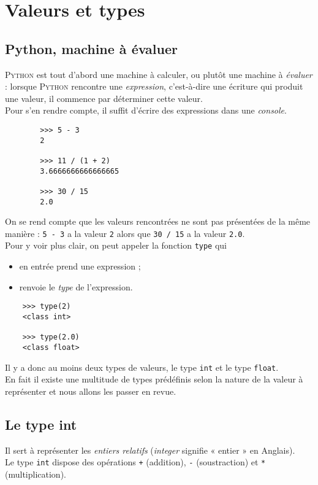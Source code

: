 \chapter{Valeurs et types}
\label{ch:valeurs}
\section{Python, machine à évaluer}
\textsc{Python} est tout d'abord une machine à calculer, ou plutôt une machine à \textit{évaluer} : lorsque \textsc{Python} rencontre une \textit{expression}, c'est-à-dire une écriture qui produit une valeur, il commence par déterminer cette valeur.\\
Pour s'en rendre compte, il suffit d'écrire des expressions dans une \textit{console}.
\begin{pyc}
    \begin{verbatim}
        >>> 5 - 3
        2
        
        >>> 11 / (1 + 2)
        3.6666666666666665

        >>> 30 / 15
        2.0
    \end{verbatim}
\end{pyc}
On se rend compte que les valeurs rencontrées ne sont pas présentées de la même manière : \texttt{5 - 3} a la valeur \texttt{2} alors que \texttt{30 / 15} a la valeur \texttt{2.0}.\\
Pour y voir plus clair, on peut appeler la fonction \texttt{type} qui 
\begin{itemize}
  \item en entrée prend une expression ;
  \item renvoie le \textit{type} de l'expression.
\end{itemize}
\begin{pyc}
  \begin{verbatim}
    >>> type(2)
    <class int>

    >>> type(2.0)
    <class float>
  \end{verbatim}
\end{pyc}

Il y a donc au moins deux types de valeurs, le type \texttt{int} et le type \texttt{float}.\\
En fait il existe une multitude de types prédéfinis selon la nature de la valeur à représenter et nous allons les passer en revue.


\section{Le type int}
\label{sec:int}
Il sert à représenter les \textit{entiers relatifs} (\textit{integer} signifie  « entier » en Anglais).\\
Le type \texttt{int} dispose des opérations \texttt{+} (addition), \texttt{-} (soustraction) et \texttt{*} (multiplication).

